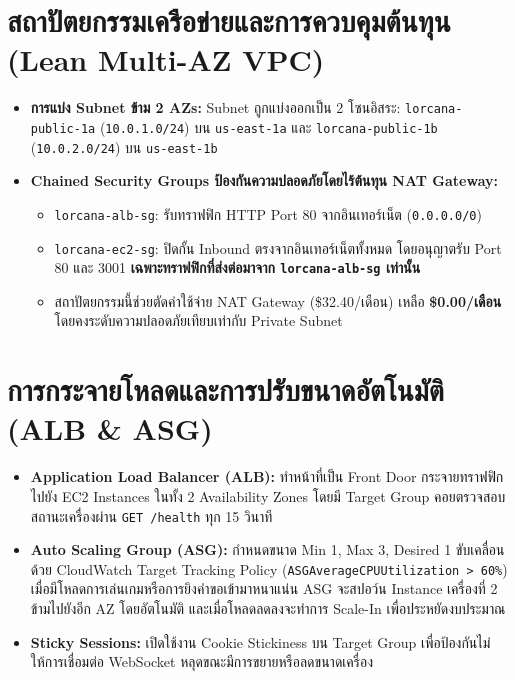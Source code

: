 \documentclass[12pt,a4paper]{report}
\begin{document}
\section{สถาปัตยกรรมเครือข่ายและการควบคุมต้นทุน (Lean Multi-AZ VPC)}
\begin{itemize}
    \item \textbf{การแบ่ง Subnet ข้าม 2 AZs:} Subnet ถูกแบ่งออกเป็น 2 โซนอิสระ: \texttt{lorcana-public-1a} (\texttt{10.0.1.0/24}) บน \texttt{us-east-1a} และ \texttt{lorcana-public-1b} (\texttt{10.0.2.0/24}) บน \texttt{us-east-1b}
    \item \textbf{Chained Security Groups ป้องกันความปลอดภัยโดยไร้ต้นทุน NAT Gateway:}
    \begin{itemize}
        \item \texttt{lorcana-alb-sg}: รับทราฟฟิก HTTP Port 80 จากอินเทอร์เน็ต (\texttt{0.0.0.0/0})
        \item \texttt{lorcana-ec2-sg}: ปิดกั้น Inbound ตรงจากอินเทอร์เน็ตทั้งหมด โดยอนุญาตรับ Port 80 และ 3001 \textbf{เฉพาะทราฟฟิกที่ส่งต่อมาจาก \texttt{lorcana-alb-sg} เท่านั้น}
        \item สถาปัตยกรรมนี้ช่วยตัดค่าใช้จ่าย NAT Gateway (\$32.40/เดือน) เหลือ \textbf{\$0.00/เดือน} โดยคงระดับความปลอดภัยเทียบเท่ากับ Private Subnet
    \end{itemize}
\end{itemize}

\section{การกระจายโหลดและการปรับขนาดอัตโนมัติ (ALB \& ASG)}
\begin{itemize}
    \item \textbf{Application Load Balancer (ALB):} ทำหน้าที่เป็น Front Door กระจายทราฟฟิกไปยัง EC2 Instances ในทั้ง 2 Availability Zones โดยมี Target Group คอยตรวจสอบสถานะเครื่องผ่าน \texttt{GET /health} ทุก 15 วินาที
    \item \textbf{Auto Scaling Group (ASG):} กำหนดขนาด Min 1, Max 3, Desired 1 ขับเคลื่อนด้วย CloudWatch Target Tracking Policy (\texttt{ASGAverageCPUUtilization > 60\%}) เมื่อมีโหลดการเล่นเกมหรือการยิงคำขอเข้ามาหนาแน่น ASG จะสปอว์น Instance เครื่องที่ 2 ข้ามไปยังอีก AZ โดยอัตโนมัติ และเมื่อโหลดลดลงจะทำการ Scale-In เพื่อประหยัดงบประมาณ
    \item \textbf{Sticky Sessions:} เปิดใช้งาน Cookie Stickiness บน Target Group เพื่อป้องกันไม่ให้การเชื่อมต่อ WebSocket หลุดขณะมีการขยายหรือลดขนาดเครื่อง
\end{itemize}
\end{document}

